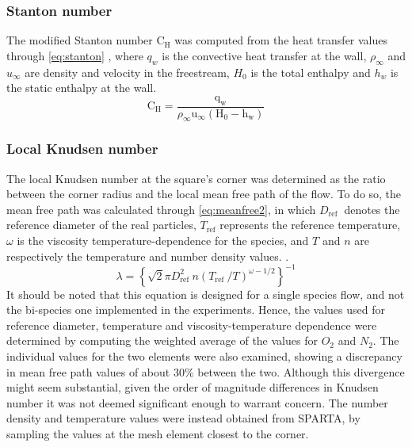 \subsubsection{Stanton number}
The modified Stanton number $\mathrm{C}_{\mathrm{H}}$ was computed from the heat transfer values through \autoref{eq:stanton} \cite{hathoraero2, rees}, where $q_w$ is the convective heat transfer at the wall, $\rho_\infty$ and $u_\infty$ are density and velocity in the freestream, $H_0$ is the total enthalpy and $h_w$ is the static enthalpy at the wall.
\begin{equation}
    \mathrm{C}_{\mathrm{H}}=\frac{\mathrm{q}_{\mathrm{w}}}{\rho_{\infty} \mathrm{u}_{\infty}\left(\mathrm{H}_0-\mathrm{h}_{\mathrm{w}}\right)}
    \label{eq:stanton}
\end{equation}

\subsubsection{Local Knudsen number}
The local Knudsen number at the square's corner was determined as the ratio between the corner radius and the local mean free path of the flow. To do so, the mean free path was calculated through \autoref{eq:meanfree2}, in which $D_{\text {ref }}$ denotes the reference diameter of the real particles, $T_{\text {ref}}$ represents the reference temperature, $\omega$ is the viscosity temperature-dependence for the species, and $T$ and $n$ are respectively the temperature and number density values. \cite{spartadoc}.
\begin{equation}
    \lambda=\left\{\sqrt{2} \pi D_{\text {ref }}^2 n\left(T_{\text {ref }} / T\right)^{\omega-1 / 2}\right\}^{-1}
    \label{eq:meanfree2}
\end{equation}
It should be noted that this equation is designed for a single species flow, and not the bi-species one implemented in the experiments. Hence, the values used for reference diameter, temperature and viscosity-temperature dependence were determined by computing the weighted average of the values for $O_2$ and $N_2$. The individual values for the two elements were also examined, showing a discrepancy in mean free path values of about 30\% between the two. Although this divergence might seem substantial, given the order of magnitude differences in Knudsen number it was not deemed significant enough to warrant concern.
The number density and temperature values were instead obtained from SPARTA, by sampling the values at the mesh element closest to the corner.

